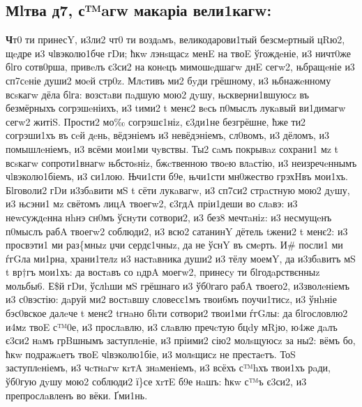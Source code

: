 \subsection[Молитва 4, святаго Макария Великого]
{Мlтва д7, с™aгw макaріа вели1кагw:}

\textbf{Ч}т0 ти принесY, и3ли2 чт0 ти воздaмъ, великодарови1тый безсмeртный цRю2,
щeдре и3 чlвэколю1бче гDи; ћкw лэнsщасz менE на твоE ўгождeніе, и3
ничт0же бlго сотв0рша, привeлъ є3си2 на конeцъ мимошeдшагw днE сегw2,
њбращeніе и3 сп7сeніе души2 моeй стр0z. Млcтивъ ми2 бyди грёшному, и3
њбнажeнному всsкагw дёла бlга: возстaви пaдшую мою2 дyшу,
њскверни1вшуюсz въ безмёрныхъ согрэшeніихъ, и3 tими2 t менє2 вeсь
п0мыслъ лукaвый ви1димагw сегw2 житіS. Прости2 мо‰ согрэшє1ніz, є3ди1не
безгрёшне, ћже ти2 согрэши1хъ въ сeй дeнь, вёдэніемъ и3 невёдэніемъ,
сл0вомъ, и3 дёломъ, и3 помышлeніемъ, и3 всёми мои1ми чyвствы. Ты2 сaмъ
покрывaz сохрани1 мz t всsкагw сопроти1внагw њбстоsніz, бжcтвенною твоeю
влaстію, и3 неизречeннымъ чlвэколю1біемъ, и3 си1лою. Њчи1сти б9е,
њчи1сти мн0жество грэхHвъ мои1хъ. Бlговоли2 гDи и3збaвити мS t сёти
лукaвагw, и3 сп7си2 стрaстную мою2 дyшу, и3 њсэни1 мz свётомъ лицA
твоегw2, є3гдA пріи1деши во слaвэ: и3 неwсуждeнна нhнэ сн0мъ ўснyти
сотвори2, и3 без8 мечтaніz: и3 несмущeнъ п0мыслъ рабA твоегw2 соблюди2,
и3 всю2 сатанинY дётель tжени2 t менє2: и3 просвэти1 ми раз\{мныz џчи
сердє1чныz, да не ўснY въ смeрть. И\# посли1 ми ѓгGла ми1рна, храни1телz
и3 настaвника души2 и3 тёлу моемY, да и3збaвитъ мS t вр†гъ мои1хъ: да
востaвъ со nдрA моегw2, принесy ти бlгодaрствєнныz мольбы6. Е\$й гDи,
ўслhши мS грёшнаго и3 ўб0гаго рабA твоего2, и3зволeніемъ и3 с0вэстію:
дaруй ми2 востaвшу словесє1мъ твои6мъ поучи1тисz, и3 ўнhніе бэс0вское
далeче t менє2 tгнaно бhти сотвори2 твои1ми ѓгGлы: да бlгословлю2 и4мz
твоE с™0е, и3 прослaвлю, и3 слaвлю пречcтую бцdу мRjю, ю4же дaлъ є3си2
нaмъ грBшнымъ заступлeніе, и3 пріими2 сію2 молsщуюсz за ны2: вёмъ бо,
ћкw подражaетъ твоE чlвэколю1біе, и3 молsщисz не престаeтъ. ТоS
заступлeніемъ, и3 чcтнaгw кrтA знaменіемъ, и3 всёхъ с™hхъ твои1хъ рaди,
ўб0гую дyшу мою2 соблюди2 ї\}се хrтE б9е нaшъ: ћкw с™ъ є3си2, и3
препрослaвленъ во вёки. Ґми1нь.
